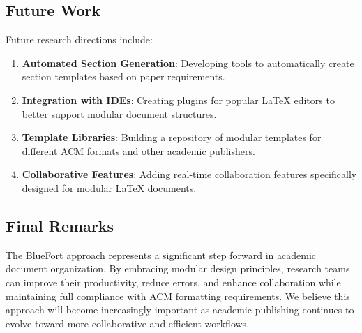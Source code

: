 \subsection{Future Work}

Future research directions include:

\begin{enumerate}
    \item \textbf{Automated Section Generation}: Developing tools to automatically 
          create section templates based on paper requirements.
    \item \textbf{Integration with IDEs}: Creating plugins for popular LaTeX editors 
          to better support modular document structures.
    \item \textbf{Template Libraries}: Building a repository of modular templates 
          for different ACM formats and other academic publishers.
    \item \textbf{Collaborative Features}: Adding real-time collaboration features 
          specifically designed for modular LaTeX documents.
\end{enumerate}

\subsection{Final Remarks}

The BlueFort approach represents a significant step forward in academic document 
organization. By embracing modular design principles, research teams can improve 
their productivity, reduce errors, and enhance collaboration while maintaining full 
compliance with ACM formatting requirements. We believe this approach will become 
increasingly important as academic publishing continues to evolve toward more 
collaborative and efficient workflows. 